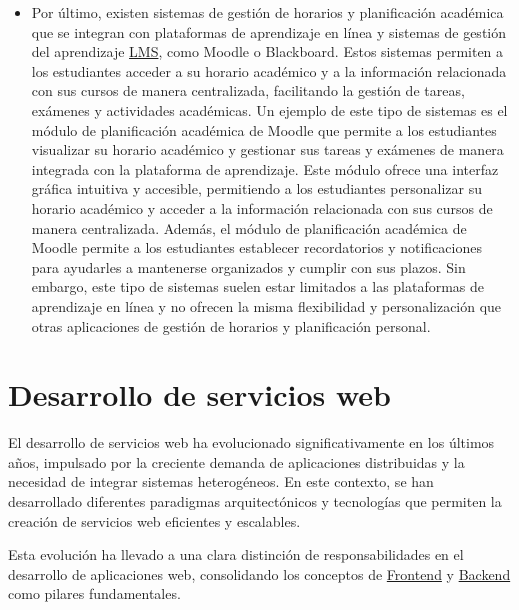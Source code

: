 \begin{itemize}
      \item Por último, existen sistemas de gestión de horarios y planificación académica que se integran con plataformas de aprendizaje en línea y sistemas de gestión del aprendizaje \hyperlink{lms}{LMS}, como Moodle \cite{webMoodle} o Blackboard.
      Estos sistemas permiten a los estudiantes acceder a su horario académico y a la información relacionada con sus cursos de manera centralizada, facilitando la gestión de tareas, exámenes y actividades académicas.
      Un ejemplo de este tipo de sistemas es el módulo de planificación académica de Moodle que permite a los estudiantes visualizar su horario académico y gestionar sus tareas y exámenes de manera integrada con la plataforma de aprendizaje.
      \newline\newline
      Este módulo ofrece una interfaz gráfica intuitiva y accesible, permitiendo a los estudiantes personalizar su horario académico y acceder a la información relacionada con sus cursos de manera centralizada. Además, el módulo de planificación académica de Moodle permite a los estudiantes establecer recordatorios y notificaciones para ayudarles a mantenerse organizados y cumplir con sus plazos.
      \newline\newline
      Sin embargo, este tipo de sistemas suelen estar limitados a las plataformas de aprendizaje en línea y no ofrecen la misma flexibilidad y personalización que otras aplicaciones de gestión de horarios y planificación personal.

\end{itemize}

\section{Desarrollo de servicios web}\label{sec:desarrollo_servicios_web}

El desarrollo de servicios web ha evolucionado significativamente en los últimos años, impulsado por la creciente demanda de aplicaciones distribuidas y la necesidad de integrar sistemas heterogéneos. En este contexto, se han desarrollado diferentes paradigmas arquitectónicos y tecnologías que permiten la creación de servicios web eficientes y escalables.

Esta evoluci\'{o}n ha llevado a una clara distinci\'{o}n de responsabilidades en el desarrollo de aplicaciones web, consolidando los conceptos de \hyperlink{frontend}{Frontend} y \hyperlink{backend}{Backend} como pilares fundamentales.

